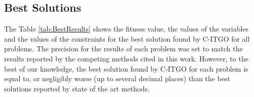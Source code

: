 \subsection{Best Solutions}

The Table \ref{tab:BestResults} shows the fitness value, the values of the variables and the values of the constraints for the best solution found by C-ITGO for all problems. The precision for the results of each problem was set to match the results reported by the competing methods cited in this work. However, to the best of our knowledge, the best solution found by C-ITGO for each problem is equal to, or negligibly worse (up to several decimal places) than the best solutions reported by state of the art methods.

